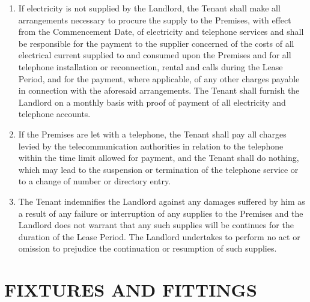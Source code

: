\documentclass[11pt]{article}
\begin{document}
\begin{enumerate}
	\item If electricity is not supplied by the Landlord, the Tenant shall make all arrangements necessary to procure the supply to the Premises, with effect from the Commencement Date, of electricity and telephone services and shall be responsible for the payment to the supplier concerned of the costs of all electrical current supplied to and consumed upon the Premises and for all telephone installation or reconnection, rental and calls during the Lease Period, and for the payment, where applicable, of any other charges payable in connection with the aforesaid arrangements. The Tenant shall furnish the Landlord on a monthly basis with proof of payment of all electricity and telephone accounts.
	\item If the Premises are let with a telephone, the Tenant shall pay all charges levied by the telecommunication authorities in relation to the telephone within the time limit allowed for payment, and the Tenant shall do nothing, which may lead to the suspension or termination of the telephone service or to a change of number or directory entry.
	\item The Tenant indemnifies the Landlord against any damages suffered by him as a result of any failure or interruption of any supplies to the Premises and the Landlord does not warrant that any such supplies will be continues for the duration of the Lease Period. The Landlord undertakes to perform no act or omission to prejudice the continuation or resumption of such supplies.
\end{enumerate}

\section{\uppercase{fixtures and fittings}}
\label{sec:fixtures-and-fittings}
\end{document}
